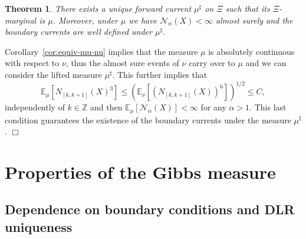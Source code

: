 \documentclass[a4paper,11pt]{article}
\newtheorem{theorem}{Theorem}[section]
\newenvironment{proof}[1][Proof]{{\sc #1.} }{\hfill $\Box$}
\newcommand{\expect}{\mathbb{E}}
\newcommand {\Z} {\mathbb{Z}}
\begin{document}
\begin{theorem}
\label{th:mu-lift}
There exists a unique forward current $\mu^\sharp$ on $\Xi$ 
such that its $\Xi$-marginal is $\mu$. Moreover, under $\mu$ 
we have $\mathcal{N}_\alpha(X) < \infty$ almost surely and 
the boundary currents are well defined under $\mu^\sharp$.
\end{theorem}
\begin{proof}
Corollary~\ref{cor:equiv-mu-nu} implies that the measure $\mu$ 
is absolutely continuous with respect to $\nu$, thus the almost 
sure events of $\nu$ carry over to $\mu$ and we can consider 
the lifted measure $\mu^\sharp$. This further implies that
$$
\expect_\mu[N_{[k,k+1]}(X)^3] 
\le 
\left(\expect_\nu[(N_{[k,k+1]}(X))^6]\right)^{1/2} 
\le 
C, 
$$
independently of $k\in\Z$ and then $\expect_\mu[\mathcal{N}_
\alpha(X)] < \infty$ for any $\alpha > 1$. This last 
condition guarantees the existence of the boundary currents 
under the measure $\mu^\sharp$.
\end{proof}

\section{Properties of the Gibbs measure}

\subsection{Dependence on boundary conditions and DLR uniqueness}
\end{document}
